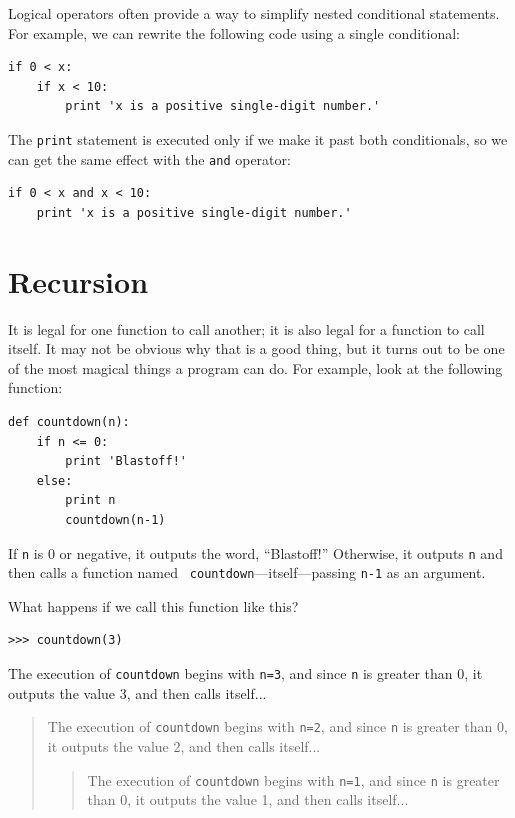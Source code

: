 \documentclass[10pt]{book}
\begin{document}
\begin{CJK}{UTF8}{gbsn}
Logical operators often provide a way to simplify nested conditional
statements.  For example, we can rewrite the following code using a
single conditional:

\begin{verbatim}
if 0 < x:
    if x < 10:
        print 'x is a positive single-digit number.'
\end{verbatim}
%
The {\tt print} statement is executed only if we make it past both
conditionals, so we can get the same effect with the {\tt and} operator:

\begin{verbatim}
if 0 < x and x < 10:
    print 'x is a positive single-digit number.'
\end{verbatim}


\section{Recursion}
\label{recursion}

It is legal for one function to call another;
it is also legal for a function to call itself.  It may not be obvious
why that is a good thing, but it turns out to be one of the most
magical things a program can do.
For example, look at the following function:

\begin{verbatim}
def countdown(n):
    if n <= 0:
        print 'Blastoff!'
    else:
        print n
        countdown(n-1)
\end{verbatim}
%
If {\tt n} is 0 or negative, it outputs the word, ``Blastoff!''
Otherwise, it outputs {\tt n} and then calls a function named {\tt
countdown}---itself---passing {\tt n-1} as an argument.

What happens if we call this function like this?

\begin{verbatim}
>>> countdown(3)
\end{verbatim}
%
The execution of {\tt countdown} begins with {\tt n=3}, and since
{\tt n} is greater than 0, it outputs the value 3, and then calls itself...

\begin{quote}
The execution of {\tt countdown} begins with {\tt n=2}, and since
{\tt n} is greater than 0, it outputs the value 2, and then calls itself...

\begin{quote}
The execution of {\tt countdown} begins with {\tt n=1}, and since
{\tt n} is greater than 0, it outputs the value 1, and then calls itself...


\end{quote}
\end{quote}
\end{CJK}
\end{document}
